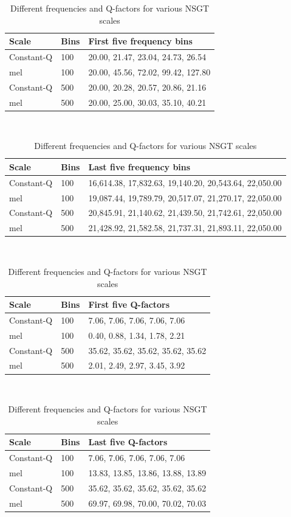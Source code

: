 \documentclass[report.tex]{subfiles}
\begin{document}
\begin{table}[ht]
	\centering
	\caption{Different frequencies and Q-factors for various NSGT scales}
	\label{table:nsgtfreqsandqs}
\begin{tabular}{ |l|l|p{10cm}| }
	 \hline
	 Scale & Bins & First five frequency bins \\
	 \hline
	 \hline
	 Constant-Q & 100 & 20.00, 21.47, 23.04, 24.73, 26.54 \\
	 \hline
	 mel & 100 & 20.00, 45.56, 72.02, 99.42, 127.80 \\
	 \hline
	 Constant-Q & 500 & 20.00, 20.28, 20.57, 20.86, 21.16 \\
	 \hline
	 mel & 500 & 20.00, 25.00, 30.03, 35.10, 40.21 \\
	 \hline
\end{tabular}\\
\vspace{1em}
\begin{tabular}{ |l|l|p{10cm}| }
	 \hline
	 Scale & Bins & Last five frequency bins \\
	 \hline
	 \hline
	 Constant-Q & 100 & 16,614.38, 17,832.63, 19,140.20, 20,543.64, 22,050.00 \\
	 \hline
	 mel & 100 & 19,087.44, 19,789.79, 20,517.07, 21,270.17, 22,050.00 \\
	 \hline
	 Constant-Q & 500 & 20,845.91, 21,140.62, 21,439.50, 21,742.61, 22,050.00 \\
	 \hline
	 mel & 500 & 21,428.92, 21,582.58, 21,737.31, 21,893.11, 22,050.00 \\
	 \hline
\end{tabular}\\
\vspace{1em}
\begin{tabular}{ |l|l|p{10cm}| }
	 \hline
	 Scale & Bins & First five Q-factors \\
	 \hline
	 \hline
	 Constant-Q & 100 & 7.06, 7.06, 7.06, 7.06, 7.06  \\
	 \hline
	 mel & 100 & 0.40, 0.88, 1.34, 1.78, 2.21 \\
	 \hline
	 Constant-Q & 500 & 35.62, 35.62, 35.62, 35.62, 35.62 \\
	 \hline
	 mel & 500 & 2.01, 2.49, 2.97, 3.45, 3.92 \\
	 \hline
\end{tabular}\\
\vspace{1em}
\begin{tabular}{ |l|l|p{10cm}| }
	 \hline
	 Scale & Bins & Last five Q-factors \\
	 \hline
	 \hline
	 Constant-Q & 100 & 7.06, 7.06, 7.06, 7.06, 7.06  \\
	 \hline
	 mel & 100 & 13.83, 13.85, 13.86, 13.88, 13.89 \\
	 \hline
	 Constant-Q & 500 & 35.62, 35.62, 35.62, 35.62, 35.62 \\
	 \hline
	 mel & 500 & 69.97, 69.98, 70.00, 70.02, 70.03 \\
	 \hline
\end{tabular}
\end{table}
\end{document}
